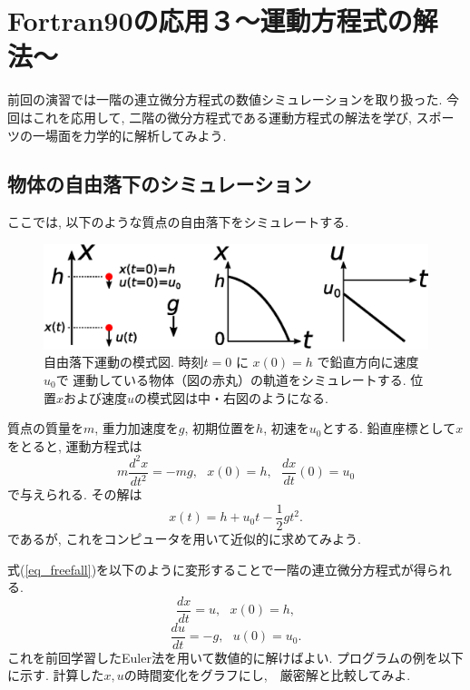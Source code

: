 \chapter{Fortran90の応用３〜運動方程式の解法〜}

前回の演習では一階の連立微分方程式の数値シミュレーションを取り扱った.  
今回はこれを応用して, 二階の微分方程式である運動方程式の解法を学び, 
スポーツの一場面を力学的に解析してみよう. 

\section{物体の自由落下のシミュレーション}
ここでは, 以下のような質点の自由落下をシミュレートする. 
\begin{figure}[ht]
\centering
\includegraphics[width=0.8\linewidth]{9_fortran6/figs/freefall.eps}
\caption{自由落下運動の模式図. 時刻$t = 0$ に $x(0)=h$ で鉛直方向に速度$u_0$で
運動している物体（図の赤丸）の軌道をシミュレートする. 
位置$x$および速度$u$の模式図は中・右図のようになる. }
\end{figure}

質点の質量を$m$, 重力加速度を$g$, 初期位置を$h$, 初速を$u_0$とする.
鉛直座標として$x$をとると, 運動方程式は
\begin{equation}
m\frac{d^2x}{dt^2}=-mg, \ \ \ x(0)=h, \ \ \ \frac{dx}{dt}(0)=u_0
\label{eq_freefall}
\end{equation}
で与えられる. 
その解は
\begin{equation}
x(t)=h+u_0t-\frac{1}{2}gt^2.
\end{equation}
であるが, これをコンピュータを用いて近似的に求めてみよう. 

式(\ref{eq_freefall})を以下のように変形することで一階の連立微分方程式が得られる.
\begin{equation}
\frac{dx}{dt}=u, \ \ \ x(0)=h,
\end{equation}
\begin{equation}
\frac{du}{dt}=-g, \ \ \ u(0)=u_0.
\end{equation}
これを前回学習したEuler法を用いて数値的に解けばよい.
プログラムの例を以下に示す.
計算した$x, u$の時間変化をグラフにし,　厳密解と比較してみよ. 

